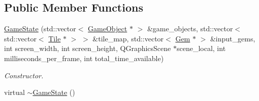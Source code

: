 \subsection*{Public Member Functions}
\begin{DoxyCompactItemize}
\item 
\hyperlink{classGameState_a284d3408e9b687a5c8c0072753d2e025}{Game\-State} (std\-::vector$<$ \hyperlink{classGameObject}{Game\-Object} $\ast$ $>$ \&game\-\_\-objects, std\-::vector$<$ std\-::vector$<$ \hyperlink{classTile}{Tile} $\ast$ $>$ $>$ \&tile\-\_\-map, std\-::vector$<$ \hyperlink{classGem}{Gem} $\ast$ $>$ \&input\-\_\-gems, int screen\-\_\-width, int screen\-\_\-height, Q\-Graphics\-Scene $\ast$scene\-\_\-local, int milliseconds\-\_\-per\-\_\-frame, int total\-\_\-time\-\_\-available)
\begin{DoxyCompactList}\small\item\em Constructor. \end{DoxyCompactList}\item 
\hypertarget{classGameState_a517ef6eaba96896259fcefd0c66afc9e}{virtual \hyperlink{classGameState_a517ef6eaba96896259fcefd0c66afc9e}{$\sim$\-Game\-State} ()}\label{classGameState_a517ef6eaba96896259fcefd0c66afc9e}


\end{DoxyCompactItemize}
